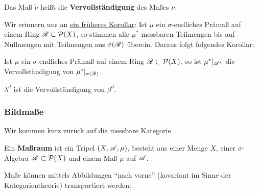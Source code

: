\begin{definition}
\begin{mdframed}
Das Maß $\widetilde{\nu}$ heißt die \textbf{Vervollständigung} des Maßes $\nu$. 
\end{mdframed}
\end{definition}

Wir erinnern uns an \hyperref[uebereinstimmung-alg]{ein früheres Korollar}: Ist $\mu$ ein $\sigma$-endliches Prämaß auf einem Ring $\RR \subset \PP(X)$, so stimmen alle $\mu^*$-messbaren Teilmengen bis auf Nullmengen mit Teilmengen aus $\sigma(\RR)$ überein. Daraus folgt folgendes Korollar:

\begin{korollar}
\begin{mdframed}
Ist $\mu$ ein $\sigma$-endliches Prämaß auf einem Ring $\RR \subset \PP(X)$, so ist $\mu^*|_{\AA^*}$ die Vervollständigung von $\mu^*|_{\sigma(\RR)}$.
\end{mdframed}
\end{korollar}

\begin{hauptbsp}
\begin{mdframed}
$\lambda^d$ ist die Vervollständigung von $\beta^d$.
\end{mdframed}
\end{hauptbsp}

\subsubsection{Bildmaße}
Wir kommen kurz zurück auf die messbare Kategorie.
\begin{definition}
\begin{mdframed}
Ein \textbf{Maßraum} ist ein Tripel $(X,\AA,\mu)$, besteht aus einer Menge $X$, einer $\sigma$-Algebra $\AA\subset \PP(X)$ und einem Maß $\mu$ auf $\AA$.
\end{mdframed}
\end{definition}

Maße können mittels Abbildungen ``nach vorne'' (kovariant im Sinne der Kategorientheorie) transportiert werden:

